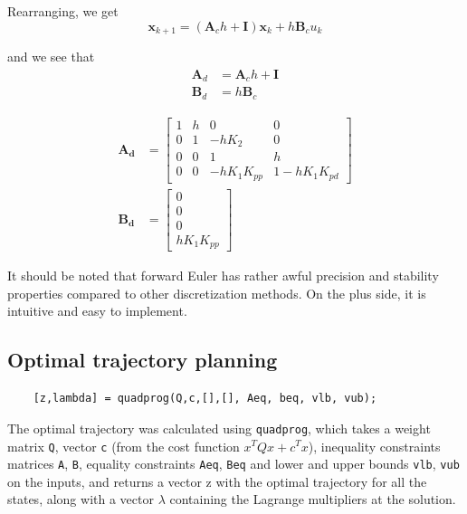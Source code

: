 Rearranging, we get
\begin{equation}
    \mathbf{x}_{k+1} = (\mathbf{A}_ch + \mathbf{I})\mathbf{x}_k + h\mathbf{B}_c{u}_k
\end{equation}

and we see that
\begin{subequations}
    \begin{align}
        \mathbf{A}_d &= \mathbf{A}_ch+\mathbf{I} \\
        \mathbf{B}_d &= h\mathbf{B}_c
    \end{align}
    \label{eq:eulerfwd}
\end{subequations}

\begin{subequations}
    \begin{align}
        \mathbf{A_d} &= \begin{bmatrix}
        1 & h & 0 & 0\\
        0 & 1 & -hK_2 & 0\\
        0 & 0 & 1 & h\\
        0 & 0 & -hK_1K_{pp} & 1-hK_1K_{pd}
        \end{bmatrix}\\
        \mathbf{B_d} &= \begin{bmatrix}
        0\\
        0\\
        0\\
        hK_1K_{pp}
    \end{bmatrix}
    \end{align}
\end{subequations}

It should be noted that forward Euler has rather awful precision and stability properties compared to other discretization methods. On the plus side, it is intuitive and easy to implement.

\subsection{Optimal trajectory planning}
\begin{lstlisting}
    [z,lambda] = quadprog(Q,c,[],[], Aeq, beq, vlb, vub);
\end{lstlisting}

The optimal trajectory  was calculated using \texttt{quadprog}, which takes a weight matrix \texttt{Q}, vector \texttt{c} (from the cost function $x^TQx + c^Tx$), inequality constraints matrices \texttt{A}, \texttt{B}, equality constraints \texttt{Aeq}, \texttt{Beq} and lower and upper bounds \texttt{vlb}, \texttt{vub} on the inputs, and returns a vector z with the optimal trajectory for all the states, along with a vector $\lambda$ containing the Lagrange multipliers at the solution.

